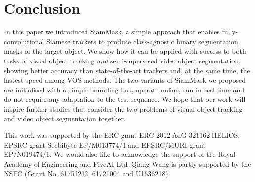 \section{Conclusion}
\label{sec:conclusion}
In this paper we introduced SiamMask, a simple approach that enables fully-convolutional Siamese trackers to produce class-agnostic binary segmentation masks of the target object.
We show how it can be applied with success to both tasks of visual object tracking \emph{and} semi-supervised video object segmentation, showing better accuracy than state-of-the-art trackers and, at the same time, the fastest speed among VOS methods.
The two variants of SiamMask we proposed are initialised with a simple bounding box, operate online, run in real-time and do not require any adaptation to the test sequence.
We hope that our work will inspire further studies that consider the two problems of visual object tracking and video object segmentation together.

This work was supported by the ERC grant ERC-2012-AdG 321162-HELIOS, EPSRC grant Seebibyte EP/M013774/1 and EPSRC/MURI grant EP/N019474/1.
We would also like to acknowledge the support of the Royal Academy of Engineering and FiveAI Ltd.
Qiang Wang is partly supported by the NSFC (Grant No. 61751212, 61721004 and U1636218).
